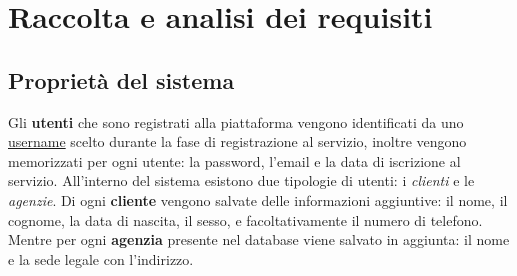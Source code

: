 \section{Raccolta e analisi dei requisiti}
\subsection{Proprietà del sistema}

%
%
Gli \textbf{utenti} che sono registrati alla piattaforma vengono identificati da uno \underline{username} scelto durante la fase di registrazione al servizio, inoltre vengono memorizzati per ogni utente: la password, l'email e la data di iscrizione al servizio.
%
%
All'interno del sistema esistono due tipologie di utenti: i \emph{clienti} e le \emph{agenzie}. Di ogni \textbf{cliente} vengono salvate delle informazioni aggiuntive: il nome, il cognome, la data di nascita, il sesso, e facoltativamente il numero di telefono. Mentre per ogni \textbf{agenzia} presente nel database viene salvato in aggiunta: il nome e la sede legale con l'indirizzo.

